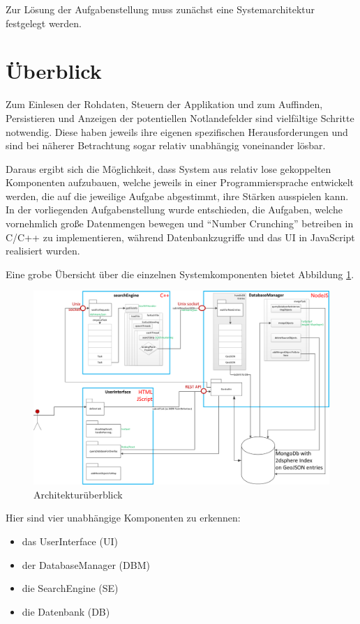 \documentclass[10pt,a4paper]{report}
\begin{document}
Zur Lösung der Aufgabenstellung muss zunächst eine Systemarchitektur festgelegt werden.

\section{Überblick}
Zum Einlesen der Rohdaten, Steuern der Applikation und zum Auffinden, Persistieren und Anzeigen der potentiellen Notlandefelder sind vielfältige Schritte notwendig. Diese haben jeweils ihre eigenen spezifischen Herausforderungen und sind bei näherer Betrachtung sogar relativ unabhängig voneinander lösbar.

Daraus ergibt sich die Möglichkeit, dass System aus relativ lose gekoppelten Komponenten aufzubauen, welche jeweils in einer Programmiersprache ent\-wickelt werden, die auf die jeweilige Aufgabe abgestimmt, ihre Stärken ausspielen kann. In der vorliegenden Aufgabenstellung wurde entschieden, die Aufgaben, welche vornehmlich große Datenmengen bewegen und "`Number Crunching"' betreiben in C/C++ zu implementieren, während Datenbankzugriffe und das UI in JavaScript realisiert wurden.

Eine grobe Übersicht über die einzelnen Systemkomponenten bietet Abbildung \ref{architektur}.

\begin{figure}[h]
	\includegraphics[width=\textwidth]{../Architektur/Architektur.png}
	\caption{Architekturüberblick} \label{architektur}
\end{figure}

Hier sind vier unabhängige Komponenten zu erkennen:
\begin{itemize}
	\item das UserInterface (UI)
	\item der DatabaseManager (DBM)
	\item die SearchEngine (SE)
	\item die Datenbank (DB)
\end{itemize}
\end{document}
